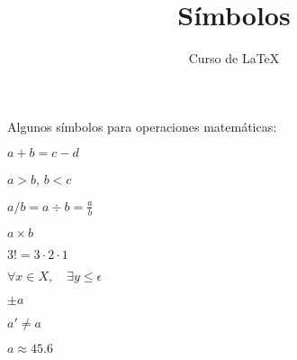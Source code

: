 \documentclass[12pt,letterpaper]{article}
\author{Curso de LaTeX}
\title{Símbolos}
\begin{document}
\maketitle

Algunos símbolos para operaciones matemáticas:

$a + b = c - d$

$a > b$, $ b < c$

$a / b = a \div b = \frac{a}{b}$ %

$ a \times b $ %

$3! = 3 \cdot 2 \cdot 1$

$ \forall x \in X, \quad \exists y \leq \epsilon $ %

$ \pm a $ %

$ a' \neq a $ %

$ a \approx 45.6$ %
\end{document}
